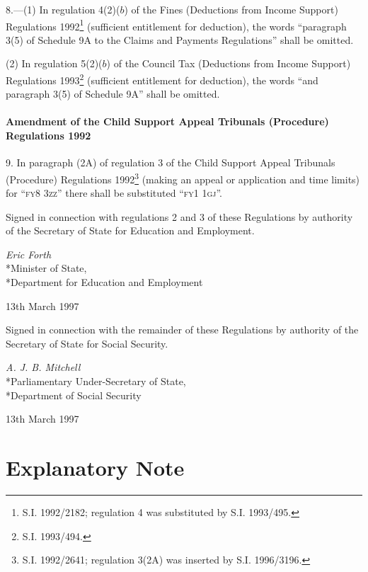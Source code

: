\documentclass[12pt,a4paper]{article}
\begin{document}
8.—(1) In regulation 4(2)($b$) of the Fines (Deductions from Income Support) Regulations 1992\footnote{\frenchspacing S.I. 1992/2182; regulation 4 was substituted by S.I. 1993/495.} (sufficient entitlement for deduction), the words “paragraph 3(5) of Schedule 9A to the Claims and Payments Regulations” shall be omitted.

(2) In regulation 5(2)($b$) of the Council Tax (Deductions from Income Support) Regulations 1993\footnote{\frenchspacing S.I. 1993/494.} (sufficient entitlement for deduction), the words “and paragraph 3(5) of Schedule 9A” shall be omitted.

\subsection[9. Amendment of the Child Support Appeal Tribunals (Procedure) Regulations 1992]{Amendment of the Child Support Appeal Tribunals (Procedure) Regulations 1992}

9.  In paragraph (2A) of regulation 3 of the Child Support Appeal Tribunals (Procedure) Regulations 1992\footnote{\frenchspacing S.I. 1992/2641; regulation 3(2A) was inserted by S.I. 1996/3196.} (making an appeal or application and time limits) for “\textsc{\lowercase{FY8 3ZZ}}” there shall be substituted “\textsc{\lowercase{FY1 1GJ}}”.

\bigskip

Signed in connection with regulations 2 and 3 of these Regulations by authority of the Secretary of State for Education and Employment.

{\raggedleft
\emph{Eric Forth}\\*Minister of State,\\*Department for Education and Employment

}

13th March 1997 

\bigskip

Signed 
in connection with the remainder of these Regulations
by authority of the Secretary of State for Social Security.

{\raggedleft
\emph{A. J. B. Mitchell}\\*Parliamentary Under-Secretary of State,\\*Department of Social Security

}

13th March 1997

\small

\part{Explanatory Note}
\end{document}
